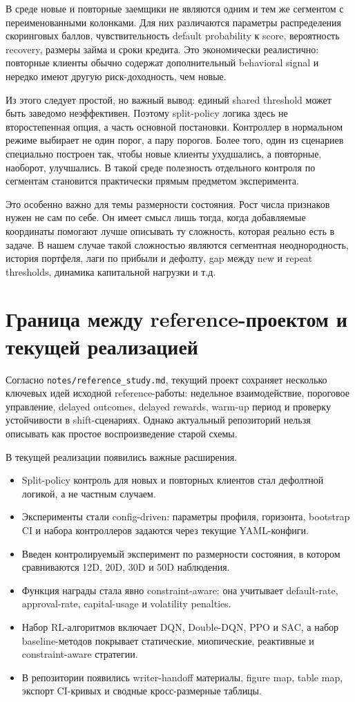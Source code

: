\documentclass[12pt,a4paper]{article}
\begin{document}
В среде новые и повторные заемщики не являются одним и тем же сегментом с переименованными колонками. Для них различаются параметры распределения скоринговых баллов, чувствительность default probability к score, вероятность recovery, размеры займа и сроки кредита. Это экономически реалистично: повторные клиенты обычно содержат дополнительный behavioral signal и нередко имеют другую риск-доходность, чем новые.

Из этого следует простой, но важный вывод: единый shared threshold может быть заведомо неэффективен. Поэтому split-policy логика здесь не второстепенная опция, а часть основной постановки. Контроллер в нормальном режиме выбирает не один порог, а пару порогов. Более того, один из сценариев специально построен так, чтобы новые клиенты ухудшались, а повторные, наоборот, улучшались. В такой среде полезность отдельного контроля по сегментам становится практически прямым предметом эксперимента.

Это особенно важно для темы размерности состояния. Рост числа признаков нужен не сам по себе. Он имеет смысл лишь тогда, когда добавляемые координаты помогают лучше описывать ту сложность, которая реально есть в задаче. В нашем случае такой сложностью являются сегментная неоднородность, история портфеля, лаги по прибыли и дефолту, gap между new и repeat thresholds, динамика капитальной нагрузки и т.д.

\section{Граница между reference-проектом и текущей реализацией}

Согласно \texttt{notes/reference\_study.md}, текущий проект сохраняет несколько ключевых идей исходной reference-работы: недельное взаимодействие, пороговое управление, delayed outcomes, delayed rewards, warm-up период и проверку устойчивости в shift-сценариях. Однако актуальный репозиторий нельзя описывать как простое воспроизведение старой схемы.

В текущей реализации появились важные расширения.
\begin{itemize}[leftmargin=*]
    \item Split-policy контроль для новых и повторных клиентов стал дефолтной логикой, а не частным случаем.
    \item Эксперименты стали config-driven: параметры профиля, горизонта, bootstrap CI и набора контроллеров задаются через текущие YAML-конфиги.
    \item Введен контролируемый эксперимент по размерности состояния, в котором сравниваются 12D, 20D, 30D и 50D наблюдения.
    \item Функция награды стала явно constraint-aware: она учитывает default-rate, approval-rate, capital-usage и volatility penalties.
    \item Набор RL-алгоритмов включает DQN, Double-DQN, PPO и SAC, а набор baseline-методов покрывает статические, миопические, реактивные и constraint-aware стратегии.
    \item В репозитории появились writer-handoff материалы, figure map, table map, экспорт CI-кривых и сводные кросс-размерные таблицы.
\end{itemize}
\end{document}

